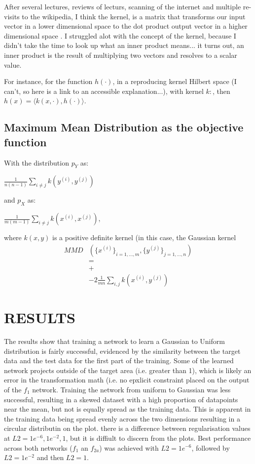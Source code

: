 \documentclass{article}
\begin{document}
After several lectures, reviews of lecturs, scanning of the internet and multiple re-visits to the wikipedia, I think the kernel, is a matrix that transforms our input vector in a lower dimensional space to the dot product output vector in a higher dimensional space \cite{wilimitis_2019} \cite{hofmann2008kernel}.  I struggled alot with the concept of the kernel, because I didn't take the time to look up what an inner product means... it turns out, an inner product is the result of multiplying two vectors and resolves to a scalar value.  

For instance, for the function $h(\cdot)$, in a reproducing kernel Hilbert space (I can't, so here is a link to an accessible explanation...), with kernel $k:$, then $h(x) =\langle k(x, \cdot ), h ( \cdot) \rangle$.

\subsection{Maximum Mean Distribution as the objective function}
\label{ssec:mmd}

With the distribution $p_Y$ as:  

$\frac {1}{n(n-1)}\sum_{i\ne j} k(y^{(i)}, y^{(j)})$  

and $p_X$ as:   

$\frac {1}{m(m-1)}\sum_{i\ne j} k(x^{(i)}, x^{(j)})$,  

where $k(x, y)$ is a positive definite kernel (in this case, the Gaussian
kernel 
$$
\begin {aligned}
MMD&(\{x^{(i)}\}_{i=1, ..., m}, \{y^{(j)}\}_{j=1, ..., n}) \\
  & = \\ 
  & + \\
  & - 2\frac{1}{mn}\sum_{i,j}k(x^{(i)},y^{(j)})
\end {aligned}
$$


%
\section{RESULTS}
\label{sec:results}
%
The results show that training a network to learn a Gaussian to Uniform distribution is fairly successful, evidenced by the similarity between the target data and the test data for the first part of the training.  Some of the learned network projects outside of the target area (i.e. greater than 1), which is likely an error in the transformation math (i.e. no epxlicit constraint placed on the output of the $f_1$ network.  Training the network from uniform to Gaussian was less successful, resulting in a skewed dataset with a high proportion of datapoints near the mean, but not is equally spread as the training data.  This is apparent in the training data being spread evenly across the two dimensions resulting in a circular distributin on the plot.
there is a difference between regularisation values at $L2 = {1e^{-6}, 1e^{-2}, 1}$, but it is diffiult to discern from the plots.  Best performance across both networks ($f_1$ an $f_{2a}$) was achieved with $L2 = 1e^{-6}$, followed by $L2 = 1e^{-2}$ and then $L2 = 1$.  
\end{document}
